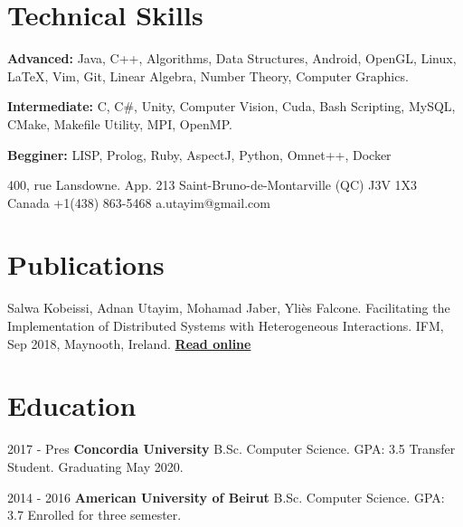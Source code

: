 \documentclass{tccv}
\begin{document}
\section{Technical Skills}

    {\textbf{Advanced:}
    Java, C++, Algorithms, Data Structures, Android, OpenGL, Linux, \LaTeX, Vim, Git, Linear Algebra, Number Theory, Computer Graphics.
    \hfill\break


    \textbf{Intermediate:}
    C, C\#, Unity, Computer Vision,  Cuda, Bash Scripting, MySQL, CMake, Makefile Utility, MPI, OpenMP.
    \hfill\break

    \textbf{Begginer:}
    LISP, Prolog, Ruby, AspectJ, Python, Omnet++, Docker}


\personal
    {400, rue Lansdowne. App. 213\hfill\break 
     Saint-Bruno-de-Montarville (QC) J3V 1X3\hfill\break
    Canada}
    {+1(438) 863-5468}
    {a.utayim@gmail.com}
    
    
    
\section{\break Publications}
{Salwa Kobeissi, Adnan Utayim, Mohamad Jaber, Yliès Falcone.  Facilitating the Implementation of Distributed Systems with Heterogeneous Interactions. IFM, Sep 2018, Maynooth, Ireland. 
\href{https://link.springer.com/chapter/10.1007/978-3-319-98938-9_15?fbclid=IwAR3mB_0l1FImySHqTeFfwwBxNwwAB3lfXOTerruuuzMAQN9nHZKYdGKVSzk}{\textbf{Read online}}
}




\section{Education}
\begin{factlist}

\item{2017 - Pres}
    {\textbf{Concordia University}\hfill\break
      B.Sc. Computer Science. GPA: 3.5\hfill\break
      Transfer Student.\hfill\break 
      Graduating May 2020.
     }

\item{2014 - 2016}
    {\textbf{American University of Beirut}\hfill\break
     B.Sc. Computer Science. GPA: 3.7 \hfill\break
     Enrolled for three semester.}


\end{factlist}    
\end{document}
